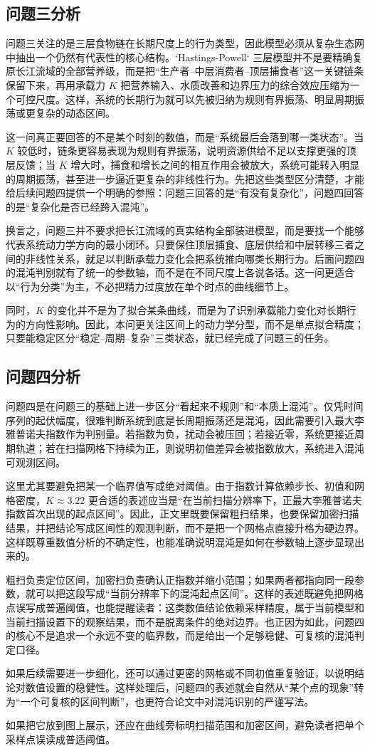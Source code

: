 \subsection{问题三分析}
问题三关注的是三层食物链在长期尺度上的行为类型，因此模型必须从复杂生态网中抽出一个仍然有代表性的核心结构。`Hastings-Powell` 三层模型并不是要精确复原长江流域的全部营养级，而是把“生产者--中层消费者--顶层捕食者”这一关键链条保留下来，再用承载力 \(K\) 把营养输入、水质改善和边界压力的综合效应压缩为一个可控尺度。这样，系统的长期行为就可以先被归纳为规则有界振荡、明显周期振荡或更复杂的动态区间。

这一问真正要回答的不是某个时刻的数值，而是“系统最后会落到哪一类状态”。当 \(K\) 较低时，链条更容易表现为规则有界振荡，说明资源供给不足以支撑更强的顶层反馈；当 \(K\) 增大时，捕食和增长之间的相互作用会被放大，系统可能转入明显的周期振荡，甚至进一步逼近更复杂的非线性行为。先把这些类型区分清楚，才能给后续问题四提供一个明确的参照：问题三回答的是“有没有复杂化”，问题四回答的是“复杂化是否已经跨入混沌”。

换言之，问题三并不要求把长江流域的真实结构全部装进模型，而是要找一个能够代表系统动力学方向的最小闭环。只要保住顶层捕食、底层供给和中层转移三者之间的非线性关系，就足以判断承载力变化会把系统推向哪类长期行为。后面问题四的混沌判别就有了统一的参数轴，而不是在不同尺度上各说各话。这一问更适合以“行为分类”为主，不必把精力过度放在单个时点的曲线细节上。

同时，\(K\) 的变化并不是为了拟合某条曲线，而是为了识别承载能力变化对长期行为的方向性影响。因此，本问更关注区间上的动力学分型，而不是单点拟合精度；只要能稳定区分“稳定--周期--复杂”三类状态，就已经完成了问题三的任务。

\subsection{问题四分析}
问题四是在问题三的基础上进一步区分“看起来不规则”和“本质上混沌”。仅凭时间序列的起伏幅度，很难判断系统到底是长周期振荡还是混沌，因此需要引入最大李雅普诺夫指数作为判别量。若指数为负，扰动会被压回；若接近零，系统更接近周期轨道；若在扫描网格下持续为正，则说明初值差异会被指数放大，系统进入混沌可观测区间。

这里尤其要避免把某一个临界值写成绝对阈值。由于指数计算依赖步长、初值和网格密度，\(K\approx 3.22\) 更合适的表述应当是“在当前扫描分辨率下，正最大李雅普诺夫指数首次出现的起点区间”。因此，正文里既要保留粗扫结果，也要保留加密扫描结果，并把结论写成区间性的观测判断，而不是把一个网格点直接升格为硬边界。这样既尊重数值分析的不确定性，也能准确说明混沌是如何在参数轴上逐步显现出来的。

粗扫负责定位区间，加密扫负责确认正指数并缩小范围；如果两者都指向同一段参数，就可以把这段写成“当前分辨率下的混沌起点区间”。这样的表述既避免把网格点误写成普遍阈值，也能提醒读者：这类数值结论依赖采样精度，属于当前模型和当前扫描设置下的观察结果，而不是脱离条件的绝对边界。也正因为如此，问题四的核心不是追求一个永远不变的临界数，而是给出一个足够稳健、可复核的混沌判定口径。

如果后续需要进一步细化，还可以通过更密的网格或不同初值重复验证，以说明结论对数值设置的稳健性。这样处理后，问题四的表述就会自然从“某个点的现象”转为“一个可复核的区间判断”，也更符合论文中对混沌识别的严谨写法。

如果把它放到图上展示，还应在曲线旁标明扫描范围和加密区间，避免读者把单个采样点误读成普适阈值。
